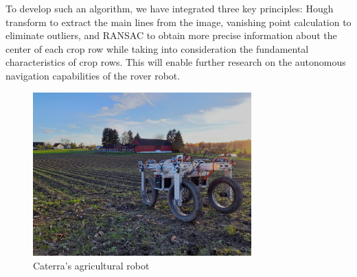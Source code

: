 To develop such an algorithm, we have integrated three key principles: Hough transform to extract the main lines from the image, vanishing point calculation to eliminate outliers, and RANSAC to obtain more precise information about the center of each crop row while taking into consideration the fundamental characteristics of crop rows. This will enable further research on the autonomous navigation capabilities of the rover robot.

\begin{figure}[H]
   \centering
   \includegraphics[width=0.75\textwidth]{Report/images/caterracoolrobot.jpg}
   \caption{Caterra's agricultural robot}
   \label{pics:coolrobot}
\end{figure}